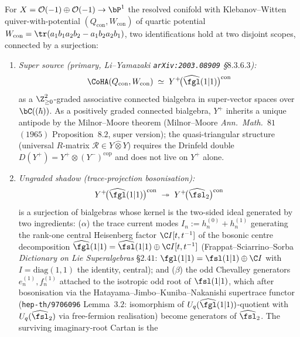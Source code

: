 \begin{theorem}
\label{thm:GofConifold}
For $X = \mathcal{O}(-1) \oplus \mathcal{O}(-1) \to \bP^1$ the resolved
conifold with Klebanov--Witten quiver-with-potential $(Q_{\mathrm{con}},
W_{\mathrm{con}})$ of quartic potential $W_{\mathrm{con}} = \tr(a_1 b_1
a_2 b_2 - a_1 b_2 a_2 b_1)$, two identifications hold at two disjoint
scopes, connected by a surjection:
\begin{enumerate}[label=\textup{(\alph*)}]
\item \emph{Super source \textup{(}primary, Li--Yamazaki
 \texttt{arXiv:2003.08909} \S$8.3.6.3$\textup{):}}
\[
 \CoHA(Q_{\mathrm{con}}, W_{\mathrm{con}})
 \;\simeq\;
 Y^+\!\bigl(\widehat{\fgl}(1|1)\bigr)^{\mathrm{con}}
\]
as a $\Z_{\geq 0}^2$-graded associative connected bialgebra in
super-vector spaces over $\bC((\hbar))$. As a positively graded
connected bialgebra, $Y^+$ inherits a unique antipode by the
Milnor--Moore theorem \textup{(}Milnor--Moore \textit{Ann.~Math.}~$81$
$(1965)$ Proposition~$8.2$, super version\textup{);} the
quasi-triangular structure \textup{(}universal $R$-matrix
$\mathcal{R} \in Y \hat\otimes Y$\textup{)} requires the Drinfeld
double $D(Y^+) = Y^+ \otimes (Y^-)^{\mathrm{cop}}$ and does not live
on $Y^+$ alone.
\item \emph{Ungraded shadow \textup{(}trace-projection bosonisation\textup{):}}
\[
 Y^+\!\bigl(\widehat{\fgl}(1|1)\bigr)^{\mathrm{con}}
 \;\twoheadrightarrow\;
 Y^+\!\bigl(\widehat{\fsl}_2\bigr)^{\mathrm{con}}
\]
is a surjection of bialgebras whose kernel is the two-sided ideal
generated by two ingredients: \textup{(}$\alpha$\textup{)} the trace
current modes $I_n := h^{(0)}_n + h^{(1)}_n$ generating the rank-one
central Heisenberg factor $\C I[t, t^{-1}]$ of the bosonic centre
decomposition $\widehat{\fgl}(1|1) = \widehat{\fsl}(1|1) \oplus
\C I[t, t^{-1}]$ \textup{(}Frappat--Sciarrino--Sorba \textit{Dictionary
on Lie Superalgebras} \S$2.41$: $\fgl(1|1) = \fsl(1|1) \oplus \C I$ with
$I = \mathrm{diag}(1, 1)$ the identity, central\textup{);} and
\textup{(}$\beta$\textup{)} the odd Chevalley generators $e^{(1)}_n,
f^{(1)}_n$ attached to the isotropic odd root of $\fsl(1|1)$, which
after bosonisation via the Hatayama--Jimbo--Kuniba--Nakanishi supertrace
functor \textup{(}\texttt{hep-th/9706096} Lemma~$3.2$: isomorphism of
$U_q(\widehat{\fgl}(1|1))$-quotient with $U_q(\widehat{\fsl}_2)$ via
free-fermion realisation\textup{)} become generators of
$\widehat{\fsl}_2$. The surviving imaginary-root Cartan is the

\end{enumerate}
\end{theorem}
